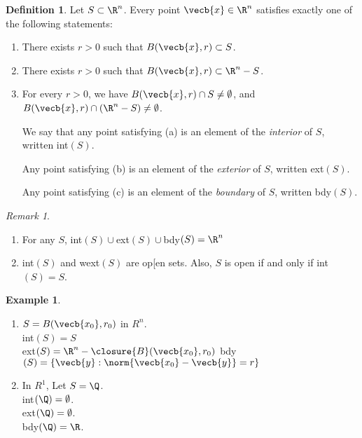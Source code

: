\documentclass[a5paper]{article}
\theoremstyle{definition}%
\newtheorem*{definition*}{Definition}
\newtheorem*{example*}{Example}
\numberwithin{exercise}{section}
\theoremstyle{remark}%
\newtheorem*{remark*}{Remark}
\begin{document}
\begin{highlight}
\begin{definition*}
Let $S\subset\R^n$. Every point $\vecb{x}\in \R^n$ satisfies exactly one of the following statements:
\begin{enumerate}[label=(\alph*)]
\item There exists $r>0$ such that $B(\vecb{ x},r)\subset S$. 
\item There exists $r>0$ such that $B(\vecb{ x},r)\subset \R^n-S$. 
\item For every $r>0$, we have $B(\vecb{ x},r)\cap S\neq\emptyset$, and $B(\vecb{ x},r)\cap (\R^n-S)\neq\emptyset$.

We say that any point satisfying (a) is an element of the \emph{interior} of $S$, written int$(S)$. 

Any point satisfying (b) is an element of the \emph{exterior} of $S$, written ext$(S)$. 

Any point satisfying (c) is an element of the \emph{boundary} of $S$, written bdy$(S)$. 
\end{enumerate}
\end{definition*}
\end{highlight}

\begin{highlight}
\begin{remark*}
\begin{enumerate}
\item For any $S$, int$(S)\cup$ext$(S)\cup$bdy$(S)=\R^n$
\item int$(S)$ and wext$(S)$ are op[en sets. Also, $S$ is open if and only if int$(S)=S$. 
\end{enumerate}
\end{remark*}
\end{highlight}

\begin{example*}\mbox{}
\begin{enumerate}
\item $S=B(\vecb{x_0},r_0)$ in $R^n$. \\
int$(S)=S$\\
ext$(S)=\R^n-\closure{B}(\vecb{x_0},r_0)$
bdy$(S)=\{\vecb{y}:\norm{\vecb{x_0}-\vecb{y}}=r\}$
\item In $R^1$, Let $S=\Q$. \\
int$(\Q)=\emptyset$.\\
ext$(\Q)=\emptyset$.\\
bdy$(\Q)=\R$.\\
\end{enumerate}
\end{example*}
\end{document}
